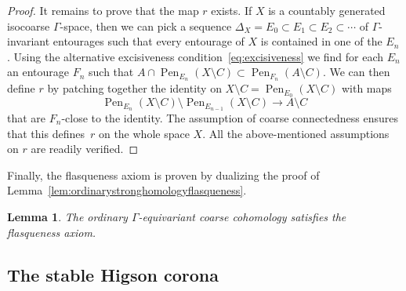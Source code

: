 \documentclass[pdftex]{sigma}
\numberwithin{equation}{section}
\newtheorem{lem}[thm]{Lemma}
\theoremstyle{definition}
\newcommand{\Diag}[1][]{{\Delta_{#1}}}
\DeclareMathOperator{\Pen}{Pen}
\begin{document}
\begin{proof}
It remains to prove that the map $r$ exists. If $X$ is a countably generated isocoarse $\Gamma$-space, then we can pick a sequence $\Diag[X]=E_0\subset E_1\subset E_2\subset\cdots$ of $\Gamma$-invariant entourages such that every entourage of $X$ is contained in one of the $E_n$. Using the alternative excisiveness condition~\eqref{eq:excisiveness} we find for each $E_n$ an entourage $F_n$ such that $A\cap\Pen_{E_n}(X\setminus C)\subset \Pen_{F_n}(A\setminus C)$. We can then define $r$ by patching together the identity on $X\setminus C=\Pen_{E_0}(X\setminus C)$ with maps
\[
\Pen_{E_{n}}(X\setminus C)\setminus \Pen_{E_{n-1}}(X\setminus C)\to A\setminus C
\]
that are $F_n$-close to the identity. The assumption of coarse connectedness ensures that this defines~$r$ on the whole space $X$. All the above-mentioned assumptions on $r$ are readily verified.
\end{proof}

Finally, the flasqueness axiom is proven by dualizing the proof of Lemma~\ref{lem:ordinarystronghomologyflasqueness}.

\begin{lem}
The ordinary $\Gamma$-equivariant coarse cohomology satisfies the flasqueness axiom.
\end{lem}

\subsection{The stable Higson corona}\label{sec:sHigCor}
\end{document}

